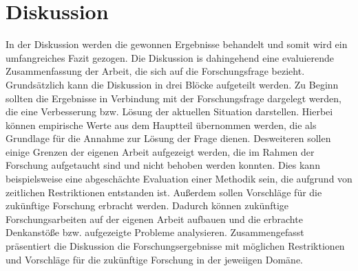 
\chapter{Diskussion}
\label{chap:Diskussion}


In der Diskussion werden die gewonnen Ergebnisse behandelt und somit wird ein umfangreiches Fazit gezogen. 
Die Diskussion is dahingehend eine evaluierende Zusammenfassung der Arbeit, die sich auf die Forschungsfrage bezieht. Grundsätzlich kann die Diskussion in drei Blöcke aufgeteilt werden. Zu Beginn sollten die Ergebnisse in Verbindung mit der Forschungsfrage dargelegt werden, die eine Verbesserung bzw. Lösung der aktuellen Situation darstellen. Hierbei können empirische Werte aus dem Hauptteil übernommen werden, die als Grundlage für die Annahme zur Lösung der Frage dienen. Desweiteren sollen einige Grenzen der eigenen Arbeit aufgezeigt werden, die im Rahmen der Forschung aufgetaucht sind und nicht behoben werden konnten. Dies kann beispielsweise eine abgeschächte Evaluation einer Methodik sein, die aufgrund von zeitlichen Restriktionen entstanden ist. Außerdem sollen Vorschläge für die zukünftige Forschung erbracht werden. Dadurch können zukünftige Forschungsarbeiten auf der eigenen Arbeit aufbauen und die erbrachte Denkanstöße bzw. aufgezeigte Probleme analysieren. Zusammengefasst präsentiert die Diskussion die Forschungsergebnisse mit möglichen Restriktionen und Vorschläge für die zukünftige Forschung in der jeweiigen Domäne. 










